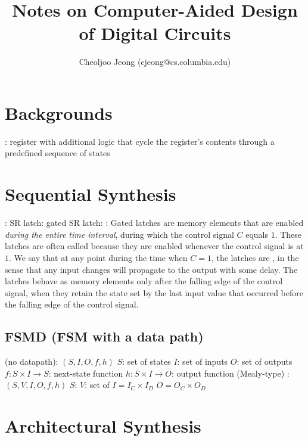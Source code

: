 \documentclass{note}
\begin{document}
\title{\large\bf Notes on Computer-Aided Design of Digital Circuits}
\author{\normalsize Cheoljoo Jeong (cjeong@cs.columbia.edu)}
\date{}
\maketitle
\section{Backgrounds}
\bit
\w {}: register with additional logic that cycle the register's
contents through a predefined sequence of states
\eit

\section{Sequential Synthesis}
\bit
\w {}:
   \bit
   \w SR latch:
   \w gated SR latch:
   \w {}:
Gated latches are memory elements that are enabled {\em during the entire time
  interval\/}, during which the control signal $C$ equals $1$.
These latches are often called  because they are
  enabled whenever the control signal is at $1$.
We say that at any point during the time when $C = 1$, the latches are
  , in the sense that any input changes will propagate to
  the output with some delay.
The latches behave as memory elements only after the falling edge of the
  control signal, when they retain the state set by the last input value that
  occurred before the falling edge of the control signal.
   \eit
\w {}
   \bit
   \w [(1)] 
   \w [(2)] 
   \w [(3)] 
   \w [(4)] 
   \w [(5)] 
   \eit
\eit
\subsection{FSMD (FSM with a data path)}
\bit
\w {} (no datapath): $(S, I, O, f, h)$
  \bit
  \w $S$: set of states
  \w $I$: set of inputs
  \w $O$: set of outputs
  \w $f: S \times I \rightarrow S$: next-state function
  \w $h: S \times I \rightarrow O$: output function (Mealy-type)
  \eit
\w {}: $(S, V, I, O, f, h)$
  \bit
  \w $S$:
  \w $V$: set of 
  \w $I = I_C \times I_D$
  \w $O = O_C \times O_D$
  \eit
\eit

\section{Architectural Synthesis}
\end{document}
